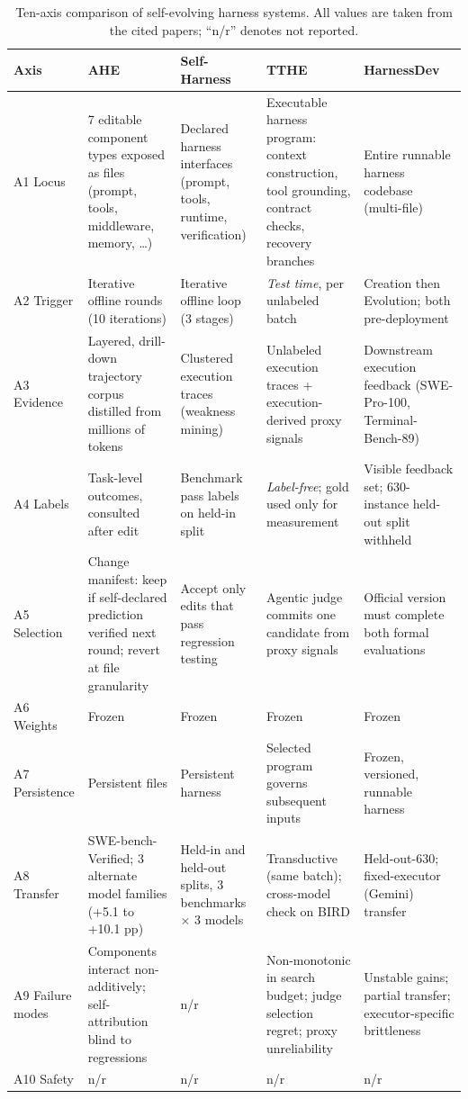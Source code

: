 \documentclass[conference]{IEEEtran}
\begin{document}
\begin{table}[t]
\caption{Ten-axis comparison of self-evolving harness systems. All values are taken from the cited papers; ``n/r'' denotes not reported.}
\label{tab:comparative}
\centering
\footnotesize
\begin{tabular}{@{}p{2.5cm}p{3.4cm}p{3.4cm}p{3.4cm}p{3.4cm}@{}}
\toprule
\textbf{Axis} & \textbf{AHE}~\cite{b3} & \textbf{Self-Harness}~\cite{b4} & \textbf{TTHE}~\cite{b5} & \textbf{HarnessDev}~\cite{b6} \\
\midrule
A1 Locus & 7 editable component types exposed as files (prompt, tools, middleware, memory, \dots) & Declared harness interfaces (prompt, tools, runtime, verification) & Executable harness program: context construction, tool grounding, contract checks, recovery branches & Entire runnable harness codebase (multi-file) \\
A2 Trigger & Iterative offline rounds (10 iterations) & Iterative offline loop (3 stages) & \emph{Test time}, per unlabeled batch & Creation then Evolution; both pre-deployment \\
A3 Evidence & Layered, drill-down trajectory corpus distilled from millions of tokens & Clustered execution traces (weakness mining) & Unlabeled execution traces + execution-derived proxy signals & Downstream execution feedback (SWE-Pro-100, Terminal-Bench-89) \\
A4 Labels & Task-level outcomes, consulted after edit & Benchmark pass labels on held-in split & \emph{Label-free}; gold used only for measurement & Visible feedback set; 630-instance held-out split withheld \\
A5 Selection & Change manifest: keep if self-declared prediction verified next round; revert at file granularity & Accept only edits that pass regression testing & Agentic judge commits one candidate from proxy signals & Official version must complete both formal evaluations \\
A6 Weights & Frozen & Frozen & Frozen & Frozen \\
A7 Persistence & Persistent files & Persistent harness & Selected program governs subsequent inputs & Frozen, versioned, runnable harness \\
A8 Transfer & SWE-bench-Verified; 3 alternate model families (+5.1 to +10.1 pp) & Held-in and held-out splits, 3 benchmarks $\times$ 3 models & Transductive (same batch); cross-model check on BIRD & Held-out-630; fixed-executor (Gemini) transfer \\
A9 Failure modes & Components interact non-additively; self-attribution blind to regressions & n/r & Non-monotonic in search budget; judge selection regret; proxy unreliability & Unstable gains; partial transfer; executor-specific brittleness \\
A10 Safety & n/r & n/r & n/r & n/r \\
\bottomrule
\end{tabular}
\end{table}
\end{document}
